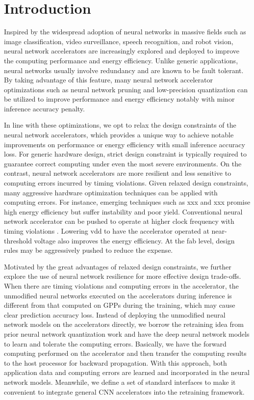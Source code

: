 \section{Introduction} \label{sec:intro}
Inspired by the widespread adoption of neural networks in massive fields such as image classification, 
video surveillance, speech recognition, and robot vision, neural network accelerators 
\cite{pipecnn_2,Zhang2015_9,Qiu2016_10,deepburing_12,Farabet2010_13,Zeng2018_18} 
are increasingly explored and deployed to improve the computing performance and energy efficiency.
Unlike generic applications, neural networks usually involve redundancy and are known to be 
fault tolerant. By taking advantage of this feature, many neural network accelerator optimizations 
such as neural network pruning and low-precision quantization can be utilized to improve 
performance and energy efficiency notably with minor inference accuracy penalty. 

In line with these optimizations, we opt to relax the design constraints of 
the neural network accelerators, which provides a unique way to achieve notable 
improvements on performance or energy efficiency with small inference accuracy loss. 
For generic hardware design, strict design constraint is typically required to 
guarantee correct computing under even the most severe environments. On the contrast, 
neural network accelerators are more resilient and less sensitive to computing 
errors incurred by timing violations. Given relaxed design constraints, many 
aggressive hardware optimization techniques can be applied with computing errors. 
For instance, emerging techniques such as xxx and xxx promise high energy efficiency 
but suffer instability and poor yield. Conventional neural network accelerator 
can be pushed to operate at higher clock frequency with timing violations
\cite{overclock_3,Paceline_15,overclock_35, overclock_retain_34,overclock_Algorithm_36}.
Lowering vdd to have the accelerator operated at near-threshold voltage 
also improves the energy efficiency. At the fab level, design rules may 
be aggressively pushed to reduce the expense. 

Motivated by the great advantages of relaxed design constraints,
we further explore the use of neural network resilience for more 
effective design trade-offs. When there are timing violations
and computing errors in the accelerator, the unmodified neural networks 
executed on the accelerators during inference is different 
from that computed on GPPs during the training, which may cause clear 
prediction accuracy loss. Instead of deploying the unmodified neural 
network models on the accelerators directly, we borrow the retraining 
idea from prior neural network quantization work \cite{Hwang2014_17,Matthieu2014_8} 
and have the deep neural network models to learn and tolerate the computing errors.  
Basically, we have the forward computing performed on the accelerator and 
then transfer the computing results to the host processor for 
backward propagation. With this approach, both application data and computing 
errors are learned and incorporated in the neural network models.  
Meanwhile, we define a set of standard interfaces to make it convenient 
to integrate general CNN accelerators into the retraining framework. 

